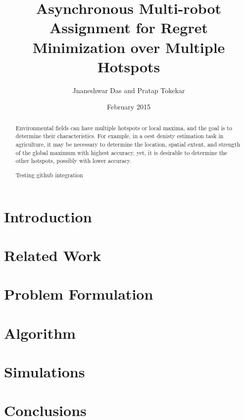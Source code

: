 \documentclass{article}
\title{Asynchronous Multi-robot Assignment for Regret Minimization over Multiple Hotspots}
\author{Jnaneshwar Das and Pratap Tokekar}
\date{February 2015}
\begin{document}
\maketitle

\begin{abstract}
Environmental fields can have multiple hotspots or local maxima, and the goal is to determine their characteristics. For example, in a oest denisty estimation task in agriculture, it may be necessary to determine the location, spatial extent, and strength of the global maximum with highest accuracy, yet, it is desirable to determine the other hotspots, possibly with lower accuracy. 

Testing github integration



\end{abstract}


\section{Introduction}

\section{Related Work}

\section{Problem Formulation}

\section{Algorithm}

\section{Simulations}

\section{Conclusions}
\end{document}
